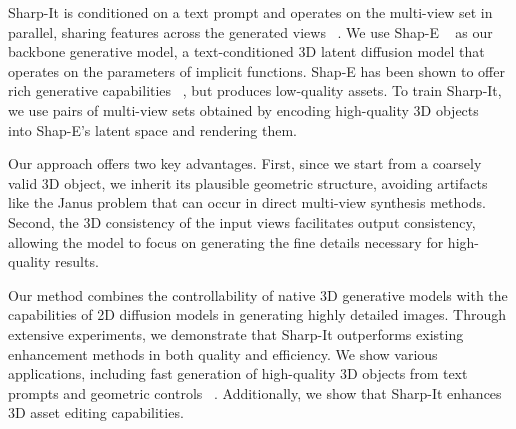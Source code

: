 Sharp-It is conditioned on a text prompt and operates on the multi-view set in parallel, sharing features across the generated views ~\cite{shi2024mvdream, shi2023zero123singleimageconsistent}. We use Shap-E ~\cite{jun2023shape} as our backbone generative model, a text-conditioned 3D latent diffusion model that operates on the parameters of implicit functions. Shap-E has been shown to offer rich generative capabilities ~\cite{chen2023shapeditor, sella2024spicee}, but produces low-quality assets. To train Sharp-It, we use pairs of multi-view sets obtained by encoding high-quality 3D objects ~\cite{Deitke_2023} into Shap-E's latent space and rendering them.


Our approach offers two key advantages. First, since we start from a coarsely valid 3D object, we inherit its plausible geometric structure, avoiding artifacts like the Janus problem that can occur in direct multi-view synthesis methods. Second, the 3D consistency of the input views facilitates output consistency, allowing the model to focus on generating the fine details necessary for high-quality results.


Our method combines the controllability of native 3D generative models with the capabilities of 2D diffusion models in generating highly detailed images. Through extensive experiments, we demonstrate that Sharp-It outperforms existing enhancement methods in both quality and efficiency. We show various applications, including fast generation of high-quality 3D objects from text prompts and geometric controls ~\cite{sella2024spicee}. Additionally, we show that Sharp-It enhances 3D asset editing capabilities.
